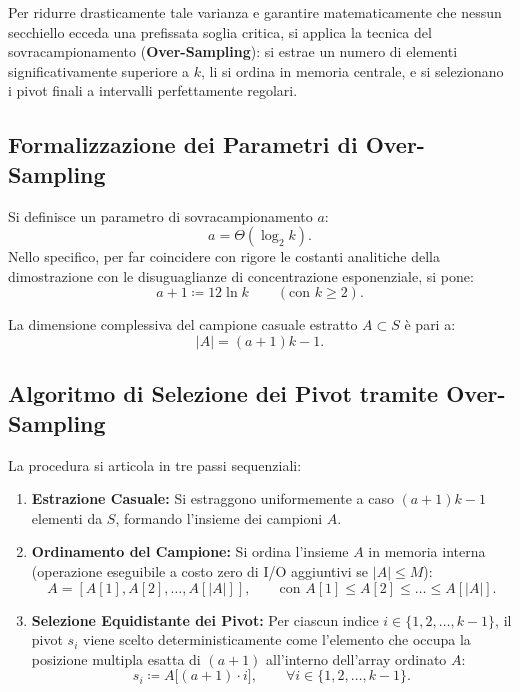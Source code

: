 Per ridurre drasticamente tale varianza e garantire matematicamente che nessun secchiello ecceda una prefissata soglia critica, si applica la tecnica del sovracampionamento (\textbf{Over-Sampling}): si estrae un numero di elementi significativamente superiore a $k$, li si ordina in memoria centrale, e si selezionano i pivot finali a intervalli perfettamente regolari.

\subsection{Formalizzazione dei Parametri di Over-Sampling}
Si definisce un parametro di sovracampionamento $a$:
\begin{equation}
  a = \Theta(\log_2 k).
\end{equation}
Nello specifico, per far coincidere con rigore le costanti analitiche della dimostrazione con le disuguaglianze di concentrazione esponenziale, si pone:
\begin{equation}
  a + 1 \coloneqq 12 \ln k \qquad (\text{con } k \ge 2).
  \label{eq:oversampling-parameter-a}
\end{equation}

La dimensione complessiva del campione casuale estratto $A \subset S$ è pari a:
\begin{equation}
  |A| = (a + 1)k - 1.
  \label{eq:sample-size-a}
\end{equation}

\subsection{Algoritmo di Selezione dei Pivot tramite Over-Sampling}
La procedura si articola in tre passi sequenziali:
\begin{enumerate}
  \item \textbf{Estrazione Casuale:} Si estraggono uniformemente a caso $(a + 1)k - 1$ elementi da $S$, formando l'insieme dei campioni $A$.
  \item \textbf{Ordinamento del Campione:} Si ordina l'insieme $A$ in memoria interna (operazione eseguibile a costo zero di I/O aggiuntivi se $|A| \le M$):
  \begin{equation}
    A = [A[1], A[2], \dots, A[|A|]], \qquad \text{con } A[1] \le A[2] \le \dots \le A[|A|].
  \end{equation}
  \item \textbf{Selezione Equidistante dei Pivot:} Per ciascun indice $i \in \{1, 2, \dots, k - 1\}$, il pivot $s_i$ viene scelto deterministicamente come l'elemento che occupa la posizione multipla esatta di $(a + 1)$ all'interno dell'array ordinato $A$:
  \begin{equation}
    s_i \coloneqq A\big[(a + 1) \cdot i\big], \qquad \forall i \in \{1, 2, \dots, k - 1\}.
    \label{eq:pivot-selection-rule}
  \end{equation}
\end{enumerate}

